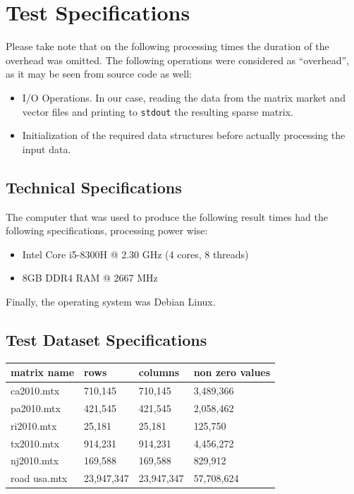 \documentclass[11pt]{article}
\begin{document}
\section{Test Specifications}
\label{sec:org2eafd2a}
Please take note that on the following processing times the duration of the overhead was omitted. The following operations were considered as ``overhead'', as it may be seen from source code as well:
\begin{itemize}
\item I/O Operations. In our case, reading the data from the matrix market and vector files and printing to \texttt{stdout} the resulting sparse matrix.
\item Initialization of the required data structures before actually processing the input data.
\end{itemize}
\subsection{Technical Specifications}
\label{sec:org4ed4eb0}
The computer that was used to produce the following result times had the following specifications, processing power wise:
\begin{itemize}
\item Intel Core i5-8300H @ 2.30 GHz (4 cores, 8 threads)
\item 8GB DDR4 RAM @ 2667 MHz
\end{itemize}
Finally, the operating system was Debian Linux.
\subsection{Test Dataset Specifications}
\label{sec:org44f1675}
\begin{center}
\begin{tabular}{llll}
\hline
matrix name & rows & columns & non zero values\\[0pt]
\hline
ca2010.mtx & 710,145 & 710,145 & 3,489,366\\[0pt]
pa2010.mtx & 421,545 & 421,545 & 2,058,462\\[0pt]
ri2010.mtx & 25,181 & 25,181 & 125,750\\[0pt]
tx2010.mtx & 914,231 & 914,231 & 4,456,272\\[0pt]
nj2010.mtx & 169,588 & 169,588 & 829,912\\[0pt]
road usa.mtx & 23,947,347 & 23,947,347 & 57,708,624\\[0pt]
\hline
\end{tabular}
\end{center}
\end{document}
